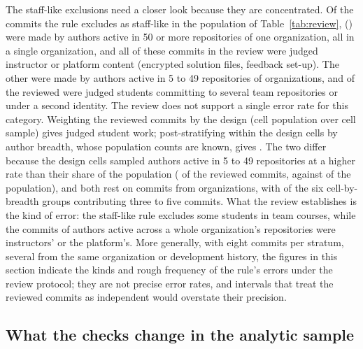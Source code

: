\documentclass[acmsmall,screen,review,anonymous]{acmart}
\begin{document}
The staff-like exclusions need a closer look because they are concentrated. Of the  commits the rule excludes as staff-like in the population of Table~\ref{tab:review},  () were made by authors active in 50 or more repositories of one organization, all in a single organization, and all  of these commits in the review were judged instructor or platform content (encrypted solution files, feedback set-up). The other  were made by authors active in 5 to 49 repositories of  organizations, and  of the  reviewed were judged students committing to several team repositories or under a second identity. The review does not support a single error rate for this category. Weighting the reviewed commits by the design (cell population over cell sample) gives  judged student work; post-stratifying within the design cells by author breadth, whose population counts are known, gives . The two differ because the design cells sampled authors active in 5 to 49 repositories at a higher rate than their share of the population ( of the  reviewed commits, against  of the population), and both rest on  commits from  organizations, with  of the six cell-by-breadth groups contributing three to five commits. What the review establishes is the kind of error: the staff-like rule excludes some students in team courses, while the commits of authors active across a whole organization's repositories were instructors' or the platform's. More generally, with eight commits per stratum, several from the same organization or development history, the figures in this section indicate the kinds and rough frequency of the rule's errors under the review protocol; they are not precise error rates, and intervals that treat the reviewed commits as independent would overstate their precision.

\subsection{What the checks change in the analytic sample}
\label{sec:samplechange}
\end{document}
